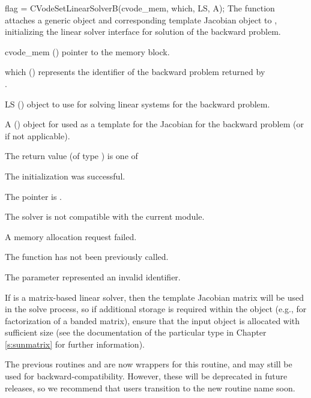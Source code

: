 {
  flag = CVodeSetLinearSolverB(cvode\_mem, which, LS, A);
}
{
  The function  attaches a generic
  {\sunlinsol} object  and corresponding template
  Jacobian {\sunmatrix} object  to {\cvodes}, initializing the
  {\cvls} linear solver interface for solution of the backward
  problem.
}
{
  \begin{args}
  \item[cvode\_mem] ()
    pointer to the {\cvodes} memory block.
  \item[which] ()
    represents the identifier of the backward problem returned by \\ \noindent
    .
  \item[LS] ()
    {\sunlinsol} object to use for solving linear systems for the backward problem.
  \item[A] ()
    {\sunmatrix} object for used as a template for the Jacobian for the backward
    problem (or  if not applicable).
  \end{args}
}
{
  The return value  (of type ) is one of
  \begin{args}
  \item[\Id{CVLS\_SUCCESS}]
    The {\cvls} initialization was successful.
  \item[\Id{CVLS\_MEM\_NULL}]
    The  pointer is .
  \item[\Id{CVLS\_ILL\_INPUT}]
    The {\cvls} solver is not compatible with the current {\nvector} module.
  \item[\Id{CVLS\_MEM\_FAIL}]
    A memory allocation request failed.
  \item[\Id{CVLS\_NO\_ADJ}]
    The function  has not been previously called.
  \item[\Id{CVLS\_ILL\_INPUT}]
    The parameter  represented an invalid identifier.
  \end{args}
}
{
  If  is a matrix-based linear solver, then the template
  Jacobian matrix  will be used in the solve process, so if
  additional storage is required within the {\sunmatrix} object
  (e.g., for factorization of a banded matrix), ensure that the input
  object is allocated with sufficient size (see the documentation of
  the particular {\sunmatrix} type in Chapter \ref{s:sunmatrix} for
  further information).

  The previous routines  and
   are now wrappers for this routine, and may
  still be used for backward-compatibility.  However, these will be
  deprecated in future releases, so we recommend that users transition
  to the new routine name soon.
}
